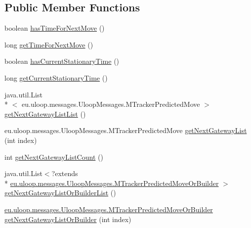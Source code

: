 \subsection*{Public Member Functions}
\begin{DoxyCompactItemize}
\item 
boolean \hyperlink{interfaceeu_1_1uloop_1_1messages_1_1UloopMessages_1_1MTrackerMessageOrBuilder_af2f9c1e18444debe7500fc178aad1ce0}{has\+Time\+For\+Next\+Move} ()
\item 
long \hyperlink{interfaceeu_1_1uloop_1_1messages_1_1UloopMessages_1_1MTrackerMessageOrBuilder_abc9ab5835bd61341f2606c9c43234b50}{get\+Time\+For\+Next\+Move} ()
\item 
boolean \hyperlink{interfaceeu_1_1uloop_1_1messages_1_1UloopMessages_1_1MTrackerMessageOrBuilder_af4d32fde029f9d69b0e04bccbd041fc3}{has\+Current\+Stationary\+Time} ()
\item 
long \hyperlink{interfaceeu_1_1uloop_1_1messages_1_1UloopMessages_1_1MTrackerMessageOrBuilder_a1ad5dcd56e2b665921e99314d591a595}{get\+Current\+Stationary\+Time} ()
\item 
java.\+util.\+List\\*
$<$ eu.\+uloop.\+messages.\+Uloop\+Messages.\+M\+Tracker\+Predicted\+Move $>$ \hyperlink{interfaceeu_1_1uloop_1_1messages_1_1UloopMessages_1_1MTrackerMessageOrBuilder_a0eafcbd9531c7637a40a06e3c16bc69a}{get\+Next\+Gateway\+List\+List} ()
\item 
eu.\+uloop.\+messages.\+Uloop\+Messages.\+M\+Tracker\+Predicted\+Move \hyperlink{interfaceeu_1_1uloop_1_1messages_1_1UloopMessages_1_1MTrackerMessageOrBuilder_aa762ee29bb176bc3aae345eb802ddcff}{get\+Next\+Gateway\+List} (int index)
\item 
int \hyperlink{interfaceeu_1_1uloop_1_1messages_1_1UloopMessages_1_1MTrackerMessageOrBuilder_ab6cd4846488811dba1d7003404d68c1d}{get\+Next\+Gateway\+List\+Count} ()
\item 
java.\+util.\+List$<$?extends \\*
\hyperlink{interfaceeu_1_1uloop_1_1messages_1_1UloopMessages_1_1MTrackerPredictedMoveOrBuilder}{eu.\+uloop.\+messages.\+Uloop\+Messages.\+M\+Tracker\+Predicted\+Move\+Or\+Builder} $>$ \hyperlink{interfaceeu_1_1uloop_1_1messages_1_1UloopMessages_1_1MTrackerMessageOrBuilder_a352dcd71d245033a6caaf574bbd15cf3}{get\+Next\+Gateway\+List\+Or\+Builder\+List} ()
\item 
\hyperlink{interfaceeu_1_1uloop_1_1messages_1_1UloopMessages_1_1MTrackerPredictedMoveOrBuilder}{eu.\+uloop.\+messages.\+Uloop\+Messages.\+M\+Tracker\+Predicted\+Move\+Or\+Builder} \hyperlink{interfaceeu_1_1uloop_1_1messages_1_1UloopMessages_1_1MTrackerMessageOrBuilder_a4142deeb4d926b48e9176a50d75ab871}{get\+Next\+Gateway\+List\+Or\+Builder} (int index)
\end{DoxyCompactItemize}


